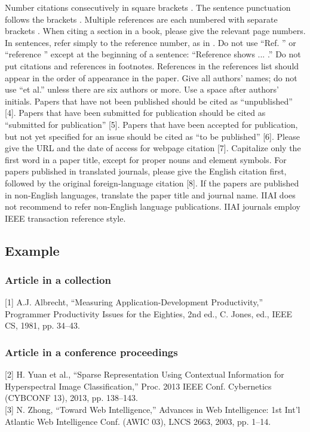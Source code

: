 \documentclass[11pt, onecolumn, twoside, a4paper]{article}
\begin{document}
Number citations consecutively in square brackets \cite{1}. 
The sentence punctuation follows the brackets \cite{2}. 
Multiple references are each numbered with separate brackets \cite{1}\cite{2}\cite{3}. 
When citing a section in a book, please give the relevant page numbers. 
In sentences, refer simply to the reference number, as in \cite{3}. 
Do not use ``Ref. \cite{3}'' or ``reference \cite{3}'' except at the beginning of a sentence: ``Reference \cite{3} shows ... .'' 
Do not put citations and references in footnotes. 
References in the references list should appear in the order of appearance in the paper. 
Give all authors’ names; do not use ``et al.'' unless there are six authors or more. 
Use a space after authors' initials. 
Papers that have not been published should be cited as ``unpublished'' [4]. 
Papers that have been submitted for publication should be cited as ``submitted for publication'' [5]. 
Papers that have been accepted for publication, but not yet specified for an issue should be cited as ``to be published'' [6]. 
Please give the URL and the date of access for webpage citation [7].
Capitalize only the first word in a paper title, except for proper nouns and element symbols. 
For papers published in translated journals, please give the English citation first, followed by the original foreign-language citation [8]. If the papers are 
published in non-English languages, translate the paper title and journal name. IIAI does not recommend to refer non-English language publications. 
IIAI journals employ IEEE transaction reference style. 


\subsection{Example}
\subsubsection{Article in a collection}
[1] A.J. Albrecht, ``Measuring Application-Development Productivity,'' Programmer Productivity Issues for the Eighties, 2nd ed., C. Jones, ed., IEEE CS, 1981, pp. 34–43.
\subsubsection{Article in a conference proceedings}
[2] H. Yuan et al., ``Sparse Representation Using Contextual Information for Hyperspectral Image Classification,'' Proc. 2013 IEEE Conf. Cybernetics (CYBCONF 13), 2013, pp. 138–143.
\\[1mm]
[3] N. Zhong, ``Toward Web Intelligence,'' Advances in Web Intelligence: 1st Int'l Atlantic Web Intelligence Conf. (AWIC 03), LNCS 2663, 2003, pp. 1–14.
\end{document}

